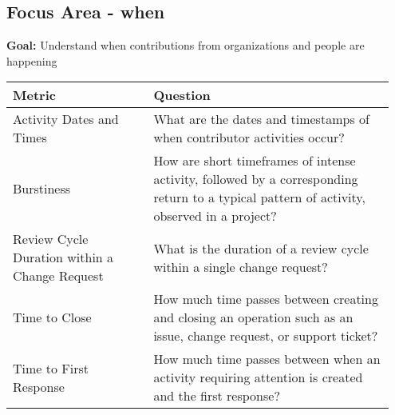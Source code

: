 
\subsection{Focus Area - when}
\textbf{Goal:} Understand when contributions from organizations and people are happening
\begin{table}[ht!]
    \centering
    \begin{tabular}{|p{0.35\linewidth} | p{0.6\linewidth}|}
        \hline
        \hfil \textbf{Metric}  & \hfil \textbf{Question} \\
        \hline
		Activity Dates and Times & What are the dates and timestamps of when contributor activities occur? \\ 
		\hline
		Burstiness & How are short timeframes of intense activity, followed by a corresponding return to a typical pattern of activity, observed in a project? \\ 
		\hline
		Review Cycle Duration within a Change Request & What is the duration of a review cycle within a single change request? \\ 
		\hline
		Time to Close & How much time passes between creating and closing an operation such as an issue, change request, or support ticket? \\ 
		\hline
		Time to First Response & How much time passes between when an activity requiring attention is created and the first response? \\ 
		\hline
    \end{tabular}
\end{table}
